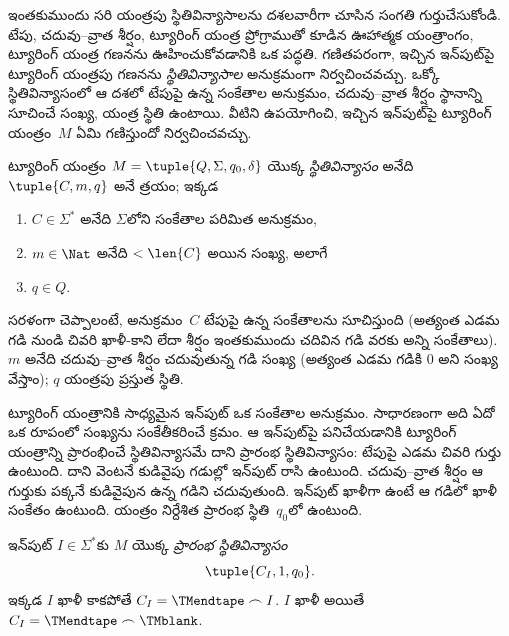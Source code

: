 \documentclass[../../../include/open-logic-section]{subfiles}
\begin{document}

\begin{explain}
ఇంతకుముందు సరి యంత్రపు స్థితివిన్యాసాలను దశలవారీగా చూసిన సంగతి
గుర్తుచేసుకోండి. టేపు, చదువు--వ్రాత శీర్షం, ట్యూరింగ్ యంత్ర ప్రోగ్రాముతో కూడిన
ఊహాత్మక యంత్రాంగం, ట్యూరింగ్ యంత్ర గణనను ఊహించుకోవడానికి
ఒక పద్ధతి. గణితపరంగా, ఇచ్చిన ఇన్‌పుట్‌పై ట్యూరింగ్ యంత్రపు గణనను
\emph{స్థితివిన్యాసాల} అనుక్రమంగా నిర్వచించవచ్చు. ఒక్కో స్థితివిన్యాసంలో
ఆ దశలో టేపుపై ఉన్న సంకేతాల అనుక్రమం, చదువు--వ్రాత శీర్షం స్థానాన్ని
సూచించే సంఖ్య, యంత్ర స్థితి ఉంటాయి. వీటిని ఉపయోగించి, ఇచ్చిన ఇన్‌పుట్‌పై ట్యూరింగ్
యంత్రం~$M$ ఏమి గణిస్తుందో నిర్వచించవచ్చు.
\end{explain}

\begin{defn}[స్థితివిన్యాసం]
ట్యూరింగ్ యంత్రం $M = \tuple{Q, \Sigma, q_0, \delta}$ యొక్క
\emph{స్థితివిన్యాసం} అనేది $\tuple{C, m, q}$ అనే త్రయం; ఇక్కడ
\begin{enumerate}
\item $C \in \Sigma^*$ అనేది $\Sigma$లోని సంకేతాల పరిమిత అనుక్రమం,
\item $m \in \Nat$ అనేది $< \len{C}$ అయిన సంఖ్య, అలాగే
\item $q \in Q$.
\end{enumerate}
సరళంగా చెప్పాలంటే, అనుక్రమం~$C$ టేపుపై ఉన్న సంకేతాలను సూచిస్తుంది (అత్యంత ఎడమ గడి నుండి చివరి ఖాళీ-కాని
లేదా శీర్షం ఇంతకుముందు చదివిన గడి వరకు అన్ని సంకేతాలు). $m$ అనేది
చదువు--వ్రాత శీర్షం చదువుతున్న గడి సంఖ్య (అత్యంత ఎడమ గడికి $0$ అని సంఖ్య వేస్తాం); $q$ యంత్రపు ప్రస్తుత స్థితి.
\end{defn}

\begin{explain}
ట్యూరింగ్ యంత్రానికి సాధ్యమైన ఇన్‌పుట్ ఒక సంకేతాల అనుక్రమం. సాధారణంగా అది ఏదో
ఒక రూపంలో సంఖ్యను సంకేతీకరించే క్రమం. ఆ ఇన్‌పుట్‌పై పనిచేయడానికి ట్యూరింగ్
యంత్రాన్ని ప్రారంభించే స్థితివిన్యాసమే దాని ప్రారంభ స్థితివిన్యాసం: టేపుపై
ఎడమ చివరి గుర్తు ఉంటుంది. దాని వెంటనే కుడివైపు గడుల్లో ఇన్‌పుట్
రాసి ఉంటుంది. చదువు--వ్రాత శీర్షం ఆ గుర్తుకు పక్కనే కుడివైపున ఉన్న
గడిని చదువుతుంది. ఇన్‌పుట్ ఖాళీగా ఉంటే ఆ గడిలో ఖాళీ సంకేతం ఉంటుంది.
యంత్రం నిర్దేశిత ప్రారంభ స్థితి~$q_0$లో ఉంటుంది.
\end{explain}

\begin{defn}[ప్రారంభ స్థితివిన్యాసం]
ఇన్‌పుట్ $I \in \Sigma^*$కు $M$ యొక్క \emph{ప్రారంభ స్థితివిన్యాసం}
\[
\tuple{C_I,1,q_0}.
\]
ఇక్కడ $I$ ఖాళీ కాకపోతే $C_I=\TMendtape\frown I$. $I$ ఖాళీ అయితే
$C_I=\TMendtape\frown\TMblank$.
\end{defn}
\end{document}
